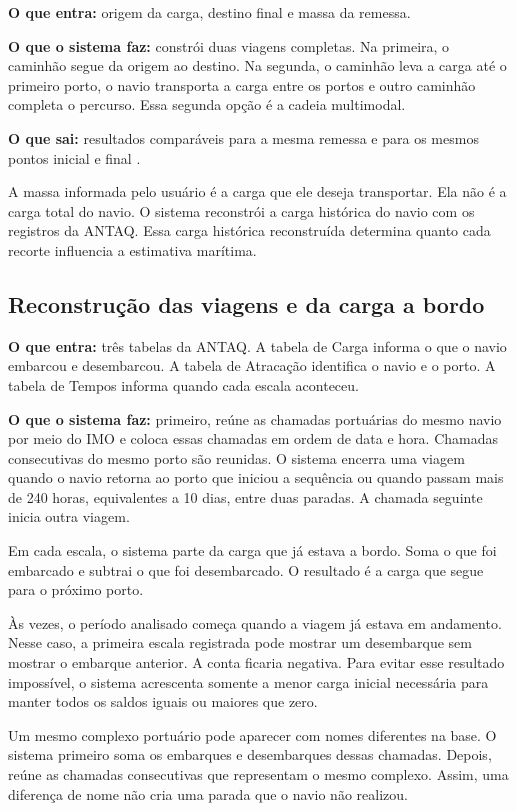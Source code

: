 \documentclass[12pt,a4paper]{article}
\begin{document}
\textbf{O que entra:} origem da carga, destino final e massa da remessa.

\textbf{O que o sistema faz:} constrói duas viagens completas. Na primeira, o caminhão segue da origem ao destino. Na segunda, o caminhão leva a carga até o primeiro porto, o navio transporta a carga entre os portos e outro caminhão completa o percurso. Essa segunda opção é a cadeia multimodal.

\textbf{O que sai:} resultados comparáveis para a mesma remessa e para os mesmos pontos inicial e final \cite{shortsea2019,competitiveness2024}.

A massa informada pelo usuário é a carga que ele deseja transportar. Ela não é a carga total do navio. O sistema reconstrói a carga histórica do navio com os registros da ANTAQ. Essa carga histórica reconstruída determina quanto cada recorte influencia a estimativa marítima.

\subsection{Reconstrução das viagens e da carga a bordo}
\label{subsec:reconstrucao-antaq}

\textbf{O que entra:} três tabelas da ANTAQ. A tabela de Carga informa o que o navio embarcou e desembarcou. A tabela de Atracação identifica o navio e o porto. A tabela de Tempos informa quando cada escala aconteceu.

\textbf{O que o sistema faz:} primeiro, reúne as chamadas portuárias do mesmo navio por meio do IMO e coloca essas chamadas em ordem de data e hora. Chamadas consecutivas do mesmo porto são reunidas. O sistema encerra uma viagem quando o navio retorna ao porto que iniciou a sequência ou quando passam mais de 240 horas, equivalentes a 10 dias, entre duas paradas. A chamada seguinte inicia outra viagem.

Em cada escala, o sistema parte da carga que já estava a bordo. Soma o que foi embarcado e subtrai o que foi desembarcado. O resultado é a carga que segue para o próximo porto.

Às vezes, o período analisado começa quando a viagem já estava em andamento. Nesse caso, a primeira escala registrada pode mostrar um desembarque sem mostrar o embarque anterior. A conta ficaria negativa. Para evitar esse resultado impossível, o sistema acrescenta somente a menor carga inicial necessária para manter todos os saldos iguais ou maiores que zero.

Um mesmo complexo portuário pode aparecer com nomes diferentes na base. O sistema primeiro soma os embarques e desembarques dessas chamadas. Depois, reúne as chamadas consecutivas que representam o mesmo complexo. Assim, uma diferença de nome não cria uma parada que o navio não realizou.
\end{document}
